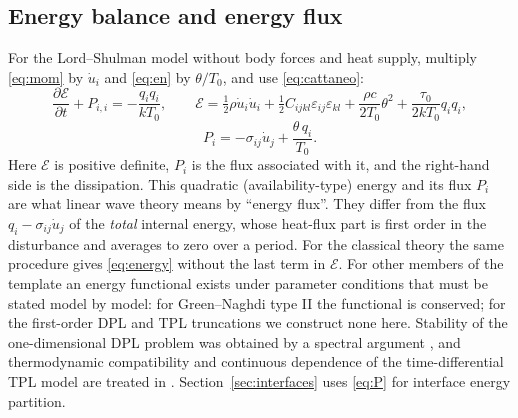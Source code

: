 \subsection{Energy balance and energy flux}\label{sec:energy}
For the Lord--Shulman model without body forces and heat supply, multiply \eqref{eq:mom} by $\dot u_i$ and \eqref{eq:en} by $\theta/T_0$, and use \eqref{eq:cattaneo}:
\begin{equation}
\frac{\partial\mathcal E}{\partial t}+P_{i,i}=-\frac{q_iq_i}{kT_0},\qquad
\mathcal E=\tfrac12\rho\dot u_i\dot u_i+\tfrac12C_{ijkl}\varepsilon_{ij}\varepsilon_{kl}+\frac{\rho c}{2T_0}\theta^2+\frac{\tau_0}{2kT_0}q_iq_i,\label{eq:energy}
\end{equation}
\begin{equation}
P_i=-\sigma_{ij}\dot u_j+\frac{\theta\,q_i}{T_0}.\label{eq:P}
\end{equation}
Here $\mathcal E$ is positive definite, $P_i$ is the flux associated with it, and the right-hand side is the dissipation. This quadratic (availability-type) energy and its flux $P_i$ are what linear wave theory means by ``energy flux''. They differ from the flux $q_i-\sigma_{ij}\dot u_j$ of the \emph{total} internal energy, whose heat-flux part is first order in the disturbance and averages to zero over a period. For the classical theory the same procedure gives \eqref{eq:energy} without the last term in $\mathcal E$. For other members of the template an energy functional exists under parameter conditions that must be stated model by model: for Green--Naghdi type II the functional is conserved; for the first-order DPL and TPL truncations we construct none here. Stability of the one-dimensional DPL problem was obtained by a spectral argument \citep{Quintanilla2003DPL}, and thermodynamic compatibility and continuous dependence of the time-differential TPL model are treated in \citep{Chirita2016}. Section~\ref{sec:interfaces} uses \eqref{eq:P} for interface energy partition.

